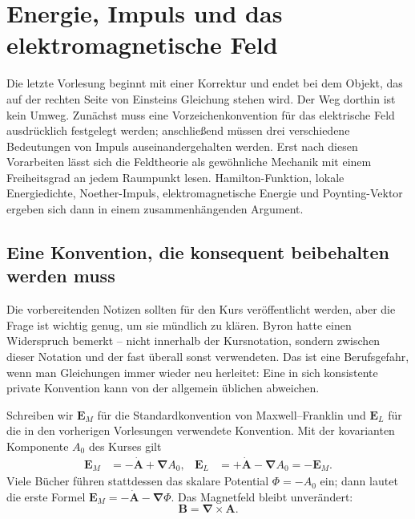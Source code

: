 \chapter{Energie, Impuls und das elektromagnetische Feld}

Die letzte Vorlesung beginnt mit einer Korrektur und endet bei dem Objekt, das auf der rechten Seite von Einsteins Gleichung stehen wird. Der Weg dorthin ist kein Umweg. Zunächst muss eine Vorzeichenkonvention für das elektrische Feld ausdrücklich festgelegt werden; anschließend müssen drei verschiedene Bedeutungen von Impuls auseinandergehalten werden. Erst nach diesen Vorarbeiten lässt sich die Feldtheorie als gewöhnliche Mechanik mit einem Freiheitsgrad an jedem Raumpunkt lesen. Hamilton-Funktion, lokale Energiedichte, Noether-Impuls, elektromagnetische Energie und Poynting-Vektor ergeben sich dann in einem zusammenhängenden Argument.

\section{Eine Konvention, die konsequent beibehalten werden muss}

Die vorbereitenden Notizen sollten für den Kurs veröffentlicht werden, aber die Frage ist wichtig genug, um sie mündlich zu klären. Byron hatte einen Widerspruch bemerkt – nicht innerhalb der Kursnotation, sondern zwischen dieser Notation und der fast überall sonst verwendeten. Das ist eine Berufsgefahr, wenn man Gleichungen immer wieder neu herleitet: Eine in sich konsistente private Konvention kann von der allgemein üblichen abweichen.

Schreiben wir \(\mathbf E_M\) für die Standardkonvention von Maxwell--Franklin und \(\mathbf E_L\) für die in den vorherigen Vorlesungen verwendete Konvention. Mit der kovarianten Komponente \(A_0\) des Kurses gilt
\begin{align}
\mathbf E_M
  &= -\dot{\mathbf A}+\boldsymbol{\nabla}A_0,
&
\mathbf E_L
  &= +\dot{\mathbf A}-\boldsymbol{\nabla}A_0
   =-\mathbf E_M .
\label{eq:two-electric-conventions}
\end{align}
Viele Bücher führen stattdessen das skalare Potential \(\Phi=-A_0\) ein; dann lautet die erste Formel
\(\mathbf E_M=-\dot{\mathbf A}-\boldsymbol{\nabla}\Phi\).
Das Magnetfeld bleibt unverändert:
\begin{equation}
\mathbf B=\boldsymbol{\nabla}\times\mathbf A.
\label{eq:B-from-A-opening}
\end{equation}

